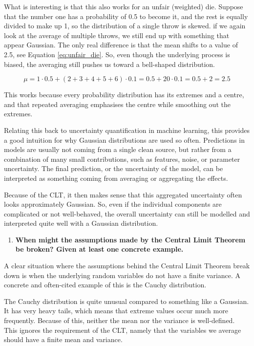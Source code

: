 \documentclass{article}
\begin{document}
What is interesting is that this also works for an unfair (weighted) die. Suppose that the number one has a probability of 0.5 to become it, and the rest is equally divided to make up 1, so the distribution of a single throw is skewed. if we again look at the average of multiple throws, we still end up with something that appear Gaussian. The only real difference is that the mean shifts to a value of 2.5, see Equation \ref{eq:unfair_die}. So, even though the underlying process is biased, the averaging still pushes us toward a bell-shaped distribution.

\begin{equation}
\mu = 1 \cdot 0.5 + (2+3+4+5+6)\cdot 0.1
= 0.5 + 20 \cdot 0.1
= 0.5 + 2
= 2.5
\label{eq:unfair_die}
\end{equation}

This works because every probability distribution has its extremes and a centre, and that repeated averaging emphasises the centre while smoothing out the extremes.

Relating this back to uncertainty quantification in machine learning, this provides a good intuition for why Gaussian distributions are used so often. Predictions in models are usually not coming from a single clean source, but rather from a combination of many small contributions, such as features, noise, or parameter uncertainty. The final prediction, or the uncertainty of the model, can be interpreted as something coming from averaging or aggregating the effects.

Because of the CLT, it then makes sense that this aggregated uncertainty often looks approximately Gaussian. So, even if the individual components are complicated or not well-behaved, the overall uncertainty can still be modelled and interpreted quite well with a Gaussian distribution.

\begin{enumerate}[resume]
    \item \textbf{When might the assumptions made by the Central Limit Theorem be broken? Given at least one concrete example.}
\end{enumerate}

A clear situation where the assumptions behind the Central Limit Theorem break down is when the underlying random variables do not have a finite variance. A concrete and often-cited example of this is the Cauchy distribution.

The Cauchy distribution is quite unusual compared to something like a Gaussian. It has very heavy tails, which means that extreme values occur much more frequently. Because of this, neither the mean nor the variance is well-defined. This ignores the requirement of the CLT, namely that the variables we average should have a finite mean and variance.
\end{document}
